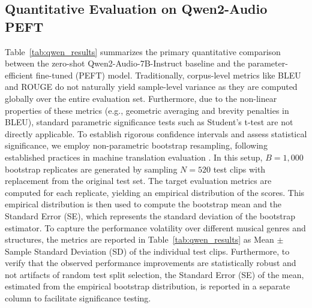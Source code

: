 \documentclass[12pt, conference, letterpaper]{IEEEtran}
\begin{document}
\subsection{Quantitative Evaluation on Qwen2-Audio PEFT}
Table~\ref{tab:qwen_results} summarizes the primary quantitative comparison between the zero-shot Qwen2-Audio-7B-Instruct baseline and the parameter-efficient fine-tuned (PEFT) model. Traditionally, corpus-level metrics like BLEU and ROUGE do not naturally yield sample-level variance as they are computed globally over the entire evaluation set. Furthermore, due to the non-linear properties of these metrics (e.g., geometric averaging and brevity penalties in BLEU), standard parametric significance tests such as Student's t-test are not directly applicable. To establish rigorous confidence intervals and assess statistical significance, we employ non-parametric bootstrap resampling, following established practices in machine translation evaluation \cite{koehn2004statistical}. In this setup, $B = 1,000$ bootstrap replicates are generated by sampling $N = 520$ test clips with replacement from the original test set. The target evaluation metrics are computed for each replicate, yielding an empirical distribution of the scores. This empirical distribution is then used to compute the bootstrap mean and the Standard Error (SE), which represents the standard deviation of the bootstrap estimator. To capture the performance volatility over different musical genres and structures, the metrics are reported in Table~\ref{tab:qwen_results} as Mean $\pm$ Sample Standard Deviation (SD) of the individual test clips. Furthermore, to verify that the observed performance improvements are statistically robust and not artifacts of random test split selection, the Standard Error (SE) of the mean, estimated from the empirical bootstrap distribution, is reported in a separate column to facilitate significance testing.
\end{document}
